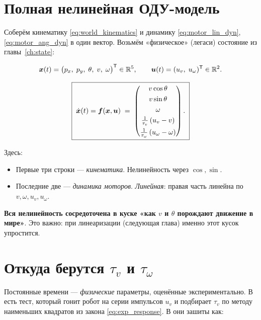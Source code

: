 \section{Полная нелинейная ОДУ-модель}

Соберём кинематику \eqref{eq:world_kinematics} и динамику
\eqref{eq:motor_lin_dyn}, \eqref{eq:motor_ang_dyn} в один вектор.
Возьмём «физическое» (легаси) состояние из главы~\ref{ch:state}:

\[
  \bm{x}(t) = \big(p_x,\; p_y,\; \theta,\; v,\; \omega\big)^{\mathsf{T}} \in \mathbb{R}^5,
  \qquad
  \bm{u}(t) = (u_v,\; u_\omega)^{\mathsf{T}} \in \mathbb{R}^2.
\]

\begin{formulabox}[title={Нелинейная ОДУ-модель робота}]
\begin{equation}
  \boxed{\;
    \dot{\bm{x}}(t) = \bm{f}(\bm{x}, \bm{u})
    \;=\;
    \begin{pmatrix}
      v\cos\theta \\[3pt]
      v\sin\theta \\[3pt]
      \omega \\[3pt]
      \frac{1}{\tau_v}\,(u_v - v) \\[5pt]
      \frac{1}{\tau_\omega}\,(u_\omega - \omega)
    \end{pmatrix}.\;}
  \label{eq:nonlinear_ode}
\end{equation}
\end{formulabox}

Здесь:
\begin{itemize}
  \item Первые три строки --- \emph{кинематика}. Нелинейность через $\cos, \sin$.
  \item Последние две --- \emph{динамика моторов}. \emph{Линейная}: правая
        часть линейна по $v, \omega, u_v, u_\omega$.
\end{itemize}

\textbf{Вся нелинейность сосредоточена в куске «как $v$ и $\theta$
порождают движение в мире»}. Это важно: при линеаризации (следующая
глава) именно этот кусок упростится.

\section{Откуда берутся $\tau_v$ и $\tau_\omega$}

Постоянные времени --- \emph{физические} параметры, оценённые
экспериментально. В  есть тест, который
гонит робот на серии импульсов $u_v$ и подбирает $\tau_v$
по методу наименьших квадратов из закона \eqref{eq:exp_response}.
В  они зашиты как:

